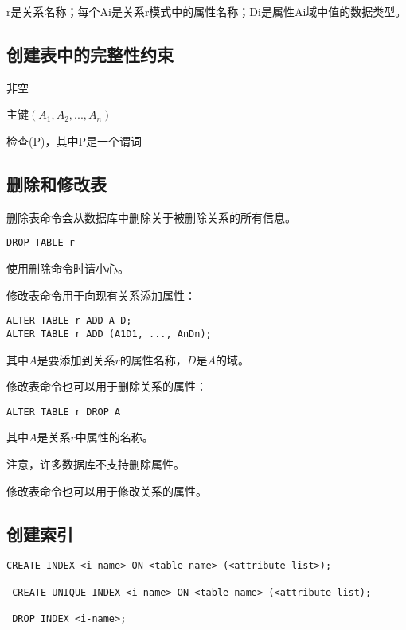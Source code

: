 r是关系名称；每个Ai是关系r模式中的属性名称；Di是属性Ai域中值的数据类型。

\subsection{创建表中的完整性约束}

非空

主键$(A_1,A_2,...,A_n)$

检查(P)，其中P是一个谓词

\subsection{删除和修改表}

删除表命令会从数据库中删除关于被删除关系的所有信息。

\begin{lstlisting}[style=sqlstyle]
DROP TABLE r    
\end{lstlisting}

使用删除命令时请小心。

修改表命令用于向现有关系添加属性：
\begin{lstlisting}[style=sqlstyle]
ALTER TABLE r ADD A D;
ALTER TABLE r ADD (A1D1, ..., AnDn);    
\end{lstlisting}
其中$A$是要添加到关系$r$的属性名称，$D$是$A$的域。

修改表命令也可以用于删除关系的属性：
\begin{lstlisting}[style=sqlstyle]
ALTER TABLE r DROP A    
\end{lstlisting}
其中$A$是关系$r$中属性的名称。

注意，许多数据库不支持删除属性。

修改表命令也可以用于修改关系的属性。

\subsection{创建索引}

\begin{lstlisting}[style=sqlstyle]
 CREATE INDEX <i-name> ON <table-name> (<attribute-list>);
 
 CREATE UNIQUE INDEX <i-name> ON <table-name> (<attribute-list);

 DROP INDEX <i-name>;
\end{lstlisting}
